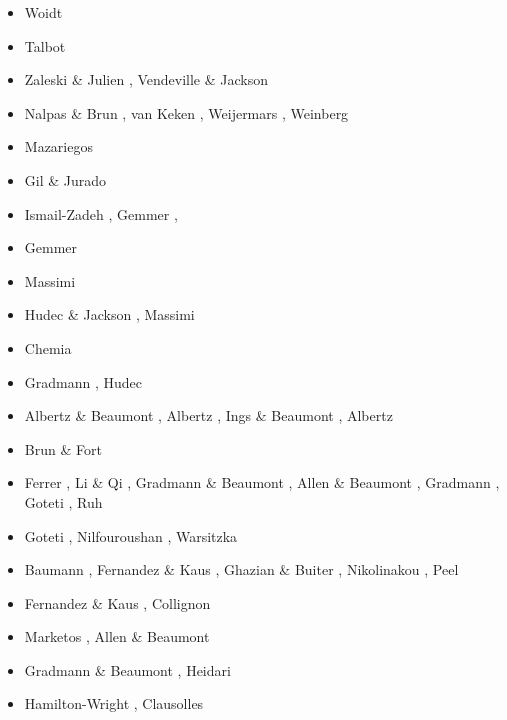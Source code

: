 \begin{scriptsize}
\begin{itemize}
\item[\nineteenseventyeight] Woidt \cite{woid78}
\item[\nineteenninetyone] Talbot \etal \cite{tars91}
\item[\nineteenninetytwo] Zaleski \& Julien \cite{zaju92},  Vendeville \& Jackson \cite{veja92}
\item[\nineteenninetythree] Nalpas \& Brun \cite{nabr93}, van Keken \etal \cite{vasv93}, 
                            Weijermars \etal \cite{wejv93}, Weinberg \cite{wein93}
\item[\nineteenninetysix] Mazariegos \etal \cite{maar96}
\item[\nineteenninetyeight] Gil \& Jurado \cite{giju98}
\item[\twothousandfour] Ismail-Zadeh \etal \cite{istt04}, Gemmer \etal \cite{geim04}, \cite{mcmg04}
\item[\twothousandfive] Gemmer \etal \cite{gebi05}
\item[\twothousandsix] Massimi \etal \cite{maqs06}
\item[\twothousandseven] Hudec \& Jackson \cite{huja07}, Massimi \etal \cite{maqs07}
\item[\twothousandeight] Chemia \etal \cite{chks08} 
\item[\twothousandnine] Gradmann  \etal \cite{grba09}, Hudec \etal \cite{hujs09}  
\item[\twothousandten] Albertz \& Beaumont \cite{albe10}, Albertz \etal \cite{albi10}, 
                       Ings \& Beaumont \cite{inbe10,inbe10b}, Albertz \etal \cite{albs10}
\item[\twothousandeleven] Brun \& Fort \cite{brfo11}
\item[\twothousandtwelve] Ferrer \etal \cite{fejr12}, Li \& Qi \cite{liqi12}, 
                          Gradmann \& Beaumont \cite{grbe12},
                          Allen \& Beaumont \cite{albe12}, Gradmann \etal \cite{grbi12},
                          Goteti \etal \cite{goib12}, Ruh \etal \cite{rukb12}
\item[\twothousandthirteen] Goteti \etal \cite{gobi13}, Nilfouroushan \etal \cite{nipc13}, 
                            Warsitzka \etal \cite{wakk13}
\item[\twothousandfourteen] Baumann \etal \cite{bakp14}, Fernandez \& Kaus \cite{feka14a,feka14b},
                            Ghazian \& Buiter \cite{ghbu14}, Nikolinakou \etal \cite{nifh14}, 
                            Peel \cite{peel14}
\item[\twothousandfifteen] Fernandez \& Kaus \cite{feka15}, Collignon \etal \cite{cofk15}
\item[\twothousandsixteen] Marketos \etal \cite{masg16}, Allen \& Beaumont \cite{albe16}
\item[\twothousandseventeen] Gradmann \& Beaumont \cite{grbe17}, Heidari \etal \cite{henf17}
\item[\twothousandnineteen] Hamilton-Wright \etal \cite{hadv19}, Clausolles \etal \cite{clcc19}
\end{itemize}
\end{scriptsize}

